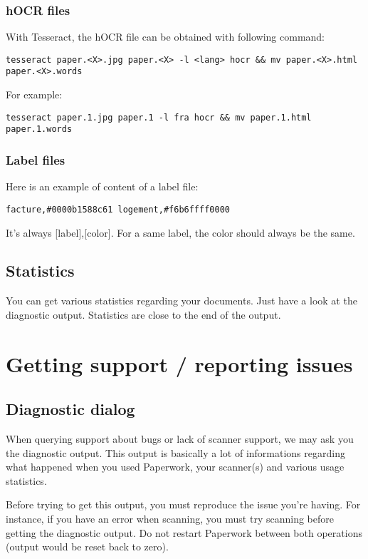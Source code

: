 \documentclass[10pt,a4paper]{article}
\begin{document}
\subsubsection{hOCR files}

With Tesseract, the hOCR file can be obtained with following command:
\begin{verbatim}
tesseract paper.<X>.jpg paper.<X> -l <lang> hocr && mv paper.<X>.html paper.<X>.words
\end{verbatim}
For example:
\begin{verbatim}
tesseract paper.1.jpg paper.1 -l fra hocr && mv paper.1.html paper.1.words
\end{verbatim}

\subsubsection{Label files}

Here is an example of content of a label file:
\begin{verbatim}
facture,#0000b1588c61 logement,#f6b6ffff0000
\end{verbatim}
It's always {[}label{]},{[}color{]}. For a same label, the color should
always be the same. 

\subsection{Statistics}

You can get various statistics regarding your documents. Just have
a look at the diagnostic output. Statistics are close to the end
of the output.

\section{Getting support / reporting issues}

\subsection{Diagnostic dialog}

When querying support about bugs or lack of scanner support, we may
ask you the diagnostic output. This output is basically a lot of informations
regarding what happened when you used Paperwork, your scanner(s) and
various usage statistics.

Before trying to get this output, you must reproduce the issue you're
having. For instance, if you have an error when scanning, you must
try scanning before getting the diagnostic output. Do not restart
Paperwork between both operations (output would be reset back to zero).
\end{document}
